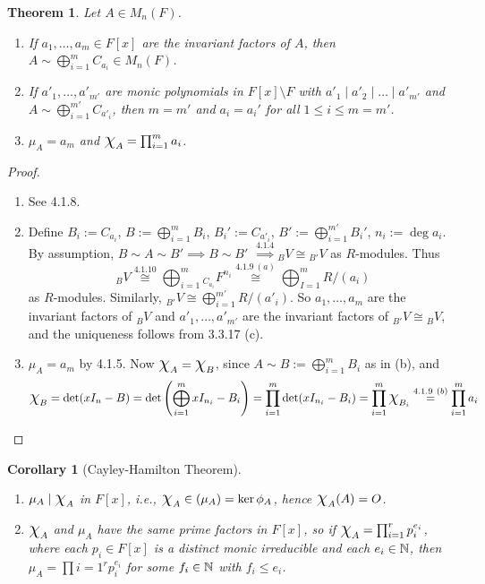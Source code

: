 \documentclass[11pt]{book}
\newcounter{counter}
\newtheorem{theorem}[counter]{Theorem}   \newtheorem*{theorem*}{Theorem}   \newtheorem{lemma}[counter]{Lemma}   \newtheorem{corollary}[counter]{Corollary}
\theoremstyle{definition}   \newtheorem{defn}[counter]{Definition} %
\newcommand{\bs}{\setminus}   \newcommand{\A}{\mathcal{A}}   \newcommand{\sy}{\textnormal{Syl}}   \newcommand{\size}[1]{\left| #1 \right|}
\newcommand{\Chi}{\mbox{\Large $\chi$}}
\newcommand{\vs}{\vspace{8pt}}
\numberwithin{counter}{chapter}
\begin{document}
\vs

\begin{theorem}
Let $A \in M_n(F)$. 
\begin{enumerate}
\item[(a)] If $a_1,\dots,a_m \in F[x]$ are the invariant factors of $A$, then $A \sim \bigoplus_{i=1}^m C_{a_i} \in M_n(F)$.
\item[(b)] If $a'_1,\dots,a'_{m'}$ are monic polynomials in $F[x]\bs F$ with $a'_1\mid a'_2 \mid \dots \mid a'_{m'}$ and $A \sim \bigoplus_{i=1}^{m'} C_{a'_i}$, then $m = m'$ and $a_i = a_i'$ for all $1 \leq i \leq m = m'$. 
\item[(c)] $\mu_A = a_m$ and $\Chi_A = \prod_{i=1}^m a_i$.
\end{enumerate}
\end{theorem}

\begin{proof}\ 
\begin{enumerate}
\item[(a)] See 4.1.8. 
\item[(b)] Define $B_i := C_{a_i}$, $B := \bigoplus_{i=1}^m B_i$, $B_i' := C_{a'_i}$, $B' := \bigoplus_{i=1}^{m'} B_i'$, $n_i := \deg a_i$. By assumption, $B \sim A \sim B' \implies B \sim B'$ $\overset{4.1.4}{\implies} {_BV} \cong {_{B'}V}$ as $R$-modules. Thus
	\[{_BV} \overset{4.1.10}{\cong} \bigoplus_{i=1}^m {_{C_{a_i}}}F^{n_i} \overset{4.1.9 \ (a)}{\cong} \bigoplus_{I=1}^m R/(a_i) \]
as $R$-modules. Similarly, ${_{B'}V} \cong \bigoplus_{i=1}^{m'} R/(a'_i)$. So $a_1,\dots,a_m$ are the invariant factors of ${_BV}$ and $a'_1,\dots,a'_{m'}$ are the invariant factors of ${_{B'}V} \cong {_BV}$, and the uniqueness follows from 3.3.17 (c). 

\item[(c)] $\mu_A = a_m$ by 4.1.5. Now $\Chi_A = \Chi_B$, since $A \sim B := \bigoplus_{i=1}^m B_i$ as in (b), and
	\[\Chi_B = \det(xI_n-B) = \det \left(\bigoplus_{i=1}^m xI_{n_i} - B_i\right) = \prod_{i=1}^m \det(xI_{n_i} - B_i) = \prod_{i=1}^m \Chi_{B_i} \overset{4.1.9\ (b)}{=} \prod_{i=1}^m a_i \]
\end{enumerate}
\end{proof}

\vs

\begin{corollary}[Cayley-Hamilton Theorem]\
\begin{enumerate}
\item[(a)] $\mu_A \mid \Chi_A$ in $F[x]$, i.e., $\Chi_A \in (\mu_A) = \ker \phi_A$, hence $\Chi_A(A) = O$. 
\item[(b)] $\Chi_A$ and $\mu_A$ have the same prime factors in $F[x]$, so if $\Chi_A = \prod_{i=1}^r p_i^{e_i}$, where each $p_i \in F[x]$ is a distinct monic irreducible and each $e_i \in \operatorname{\mathbb{N}}$, then $\mu_A = \prod{i=1}^r p_i^{e_i}$ for some $f_i \in \operatorname{\mathbb{N}}$ with $f_i \leq e_i$. 
\end{enumerate}
\end{corollary}
\end{document}
